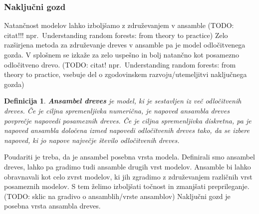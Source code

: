 \documentclass[12pt,a4paper]{article}
\newtheorem{definicija}{Definicija}
\begin{document}
\subsubsection{Naključni gozd}

Natančnost modelov lahko izboljšamo z združevanjem v ansamble (TODO: citat!!! npr.\ Understanding random forests: from theory to practice)
Zelo razširjena metoda za združevanje dreves v ansamble pa je model odločitvenega gozda. 
V splošnem se izkaže za zelo uspešno in bolj natančno kot posamezno odločitveno drevo. 
(TODO: citat! npr.\ Understanding random forests: from theory to practice, vsebuje del o zgodovinskem razvoju/utemeljitvi naključnega gozda)

\begin{definicija}
\textbf{Ansambel dreves} je model, ki je sestavljen iz več odločitvenih dreves. 
Če je ciljna spremenljivka numerična, je napoved ansambla dreves povprečje napovedi posameznih dreves. 
Če je ciljna spremenljivka diskretna, pa je napoved ansambla določena izmed napovedi odločitvenih dreves tako, da se izbere napoved, ki jo napove največje število odločitvenih dreves.
\end{definicija}

Poudariti je treba, da je ansambel posebna vrsta modela. 
Definirali smo ansambel dreves, lahko pa gradimo tudi ansamble drugih vrst modelov. 
Ansamble bi lahko obravnavali kot celo zvrst modelov, ki jih zgradimo z združevanjem različnih vrst posameznih modelov. 
S tem želimo izboljšati točnost in zmanjšati preprileganje. (TODO: sklic na gradivo o ansamblih/vrste ansamblov) Naključni gozd je posebna vrsta ansambla dreves.
\end{document}

